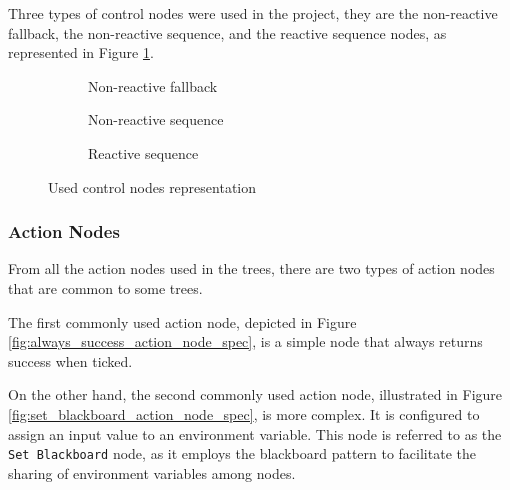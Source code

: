 Three types of control nodes were used in the project, they are the non-reactive fallback, the non-reactive sequence, and the reactive sequence nodes, as represented in Figure \ref{fig:control_nodes_spec}.

\begin{figure}[!h]
    \centering
    \begin{subfigure}[b]{.32\linewidth}
        \centering
        \scalebox{.8} {
            \begin{forest}
            \end{forest}
        }
        \caption{Non-reactive fallback}
    \end{subfigure}
    \hfill
    \begin{subfigure}[b]{.32\linewidth}
        \centering
        \scalebox{.8} {
            \begin{forest}
            \end{forest}
        }
        \caption{Non-reactive sequence}
    \end{subfigure}
    \hfill
    \begin{subfigure}[b]{.32\linewidth}
        \centering
        \scalebox{.8} {
            \begin{forest}
            \end{forest}
        }
        \caption{Reactive sequence}
    \end{subfigure}
    \caption{Used control nodes representation}
    \label{fig:control_nodes_spec}
\end{figure}

\subsubsection{Action Nodes}
\label{subsubsec:common_action_nodes_spec}

From all the action nodes used in the trees, there are two types of action nodes that are common to some trees.

The first commonly used action node, depicted in Figure \ref{fig:always_success_action_node_spec}, is a simple node that always returns success when ticked. 

On the other hand, the second commonly used action node, illustrated in Figure \ref{fig:set_blackboard_action_node_spec}, is more complex. It is configured to assign an input value to an environment variable. This node is referred to as the \texttt{Set Blackboard} node, as it employs the blackboard pattern to facilitate the sharing of environment variables among nodes.

